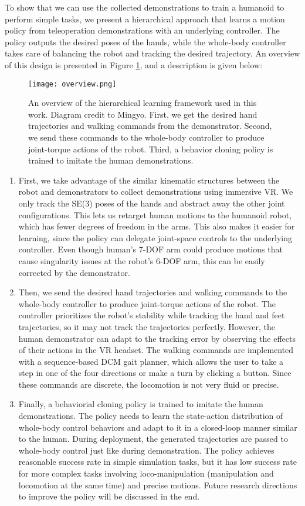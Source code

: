 To show that we can use the collected demonstrations to train a humanoid to perform simple tasks, we present a hierarchical approach that learns a motion policy from teleoperation demonstrations with an underlying controller. The policy outputs the desired poses of the hands, while the whole-body controller takes care of balancing the robot and tracking the desired trajectory. An overview of this design is presented in Figure \ref{fig:overview}, and a description is given below:
\begin{figure}
    \centering
    \texttt{[image: overview.png]}
    \caption{An overview of the hierarchical learning framework used in this work. Diagram credit to Mingyo. First, we get the desired hand trajectories and walking commands from the demonstrator. Second, we send these commands to the whole-body controller to produce joint-torque actions of the robot. Third, a behavior cloning policy is trained to imitate the human demonstrations. }
    \label{fig:overview}
\end{figure}
\begin{enumerate}
    \item First, we take advantage of the similar kinematic structures between the robot and demonstrators to collect demonstrations using immersive VR. 
We only track the SE(3) poses of the hands and abstract away the other joint configurations. This lets us retarget human motions to the humanoid robot, which has fewer degrees of freedom in the arms. This also makes it easier for learning, since the policy can delegate joint-space controls to the underlying controller. Even though human's 7-DOF arm could produce motions that cause singularity issues at the robot's 6-DOF arm, this can be easily corrected by the demonstrator. 
\item Then, we send the desired hand trajectories and walking commands to the whole-body controller to produce joint-torque actions of the robot. The controller prioritizes the robot's stability while tracking the hand and feet trajectories, so it may not track the trajectories perfectly. However, the human demonstrator can adapt to the tracking error by observing the effects of their actions in the VR headset. The walking commands are implemented with a sequence-based DCM gait planner, which allows the user to take a step in one of the four directions or make a turn by clicking a button. Since these commands are discrete, the locomotion is not very fluid or precise. 
\item Finally, a behaviorial cloning policy is trained to imitate the human demonstrations. The policy needs to learn the state-action distribution of whole-body control behaviors and adapt to it in a closed-loop manner similar to the human. During deployment, the generated trajectories are passed to whole-body control just like during demonstration. The policy achieves reasonable success rate in simple simulation tasks, but it has low success rate for more complex tasks involving loco-manipulation (manipulation and locomotion at the same time) and precise motions. Future research directions to improve the policy will be discussed in the end. 
\end{enumerate}

